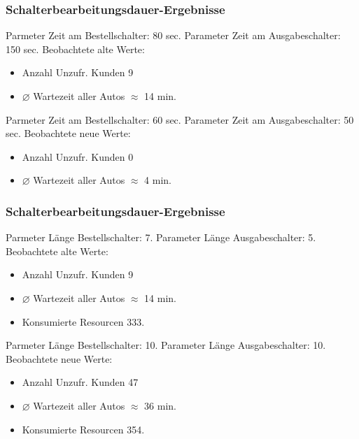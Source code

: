 \documentclass{beamer}
\begin{document}
\begin{frame}

\frametitle{Schalterbearbeitungsdauer-Ergebnisse}
	
	
	Parmeter Zeit am Bestellschalter: 80 sec. \newline
	Parameter Zeit am Ausgabeschalter: 150 sec. \newline
	Beobachtete alte Werte:\newline
	
  	\begin{itemize}
  		\item Anzahl Unzufr. Kunden 9
  		\item $\diameter$ Wartezeit aller Autos $\approx$ 14 min.
  	
  	\end{itemize}

	
	Parmeter Zeit am Bestellschalter: 60 sec. \newline
	Parameter Zeit am Ausgabeschalter: 50 sec. \newline
	Beobachtete neue Werte: \newline
		\begin{itemize}
  		\item Anzahl Unzufr. Kunden 0
  		\item $\diameter$ Wartezeit aller Autos $\approx$ 4 min.
  		
  	\end{itemize}

\end{frame}

\begin{frame}

\frametitle{Schalterbearbeitungsdauer-Ergebnisse}
	
	
	Parmeter Länge Bestellschalter: 7. \newline
	Parameter Länge Ausgabeschalter: 5. \newline
	Beobachtete alte Werte:
	
  	\begin{itemize}
  		\item Anzahl Unzufr. Kunden 9
  		\item $\diameter$ Wartezeit aller Autos $\approx$ 14 min.
  		\item Konsumierte Resourcen 333.
  	
  	\end{itemize}


	Parmeter Länge Bestellschalter: 10. \newline
	Parameter Länge Ausgabeschalter: 10. \newline
	Beobachtete neue Werte: 
		\begin{itemize}
  		\item Anzahl Unzufr. Kunden 47
  		\item $\diameter$ Wartezeit aller Autos $\approx$ 36 min.
  		\item Konsumierte Resourcen 354.
  		
  	\end{itemize}

\end{frame}
\end{document}
